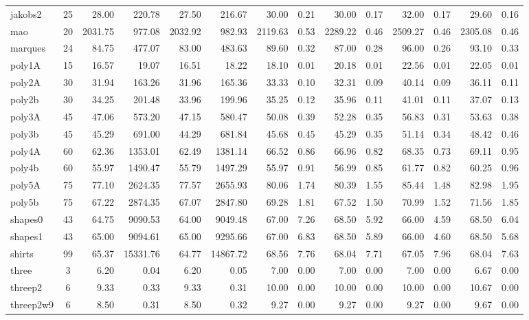 \documentclass[12pt, openright, twoside, a4paper, english, brazilian]{USPSC-classe/USPSC}
\newcommand{\lgray}{\cellcolor{lightgray}}
\begin{document}
\begin{adjustwidth}{-2.5 cm}{-2.5 cm}
\begin{threeparttable}[!htb]
{\begin{tabular}{|l|c|rr|rr|rr|rr|rr|rr|}
        jakobs2 &25 &28.00 &220.78 &\lgray27.50 &216.67 &30.00 &0.21 &30.00 &0.17 &32.00 &0.17 &29.60 &0.16 \\
        mao &20 &\lgray2031.75 &977.08 &2032.92 &982.93 &2119.63 &0.53 &2289.22 &0.46 &2509.27 &0.46 &2305.08 &0.46 \\
        marques &24 &84.75 &477.07 &\lgray83.00 &483.63 &89.60 &0.32 &87.00 &0.28 &96.00 &0.26 &93.10 &0.33 \\
        poly1A &15 &16.57 &19.07 &\lgray16.51 &18.22 &18.10 &0.01 &20.18 &0.01 &22.56 &0.01 &22.05 &0.01 \\
        poly2A &30 &\lgray31.94 &163.26 &31.96 &165.36 &33.33 &0.10 &32.31 &0.09 &40.14 &0.09 &36.11 &0.11 \\
        poly2b &30 &34.25 &201.48 &\lgray33.96 &199.96 &35.25 &0.12 &35.96 &0.11 &41.01 &0.11 &37.07 &0.13 \\
        poly3A &45 &\lgray47.06 &573.20 &47.15 &580.47 &50.08 &0.39 &52.28 &0.35 &56.83 &0.31 &53.63 &0.38 \\
        poly3b &45 &45.29 &691.00 &\lgray44.29 &681.84 &45.68 &0.45 &45.29 &0.35 &51.14 &0.34 &48.42 &0.46 \\
        poly4A &60 &\lgray62.36 &1353.01 &62.49 &1381.14 &66.52 &0.86 &66.96 &0.82 &68.35 &0.73 &69.11 &0.95 \\
        poly4b &60 &55.97 &1490.47 &\lgray55.79 &1497.29 &55.97 &0.91 &56.99 &0.85 &61.77 &0.82 &60.25 &0.96 \\
        poly5A &75 &\lgray77.10 &2624.35 &77.57 &2655.93 &80.06 &1.74 &80.39 &1.55 &85.44 &1.48 &82.98 &1.95 \\
        poly5b &75 &67.22 &2874.35 &\lgray67.07 &2847.80 &69.28 &1.81 &67.52 &1.50 &70.99 &1.52 &71.56 &1.85 \\
        shapes0 &43 &64.75 &9090.53 &\lgray64.00 &9049.48 &67.00 &7.26 &68.50 &5.92 &66.00 &4.59 &68.50 &6.04 \\
        shapes1 &43 &\lgray65.00 &9094.61 &\lgray65.00 &9295.66 &67.00 &6.83 &68.50 &5.89 &66.00 &4.60 &68.50 &5.68 \\
        shirts &99 &65.37 &15331.76 &\lgray64.77 &14867.72 &68.56 &7.76 &68.04 &7.71 &67.05 &7.96 &68.04 &7.63 \\
        three &3 &\lgray6.20 &0.04 &\lgray6.20 &0.05 &7.00 &0.00 &7.00 &0.00 &7.00 &0.00 &6.67 &0.00 \\
        threep2 &6 &\lgray9.33 &0.33 &\lgray9.33 &0.31 &10.00 &0.00 &10.00 &0.00 &10.00 &0.00 &10.67 &0.00 \\
        threep2w9 &6 &\lgray8.50 &0.31 &\lgray8.50 &0.32 &9.27 &0.00 &9.27 &0.00 &9.27 &0.00 &9.67 &0.00 \\

\end{tabular}}
\end{threeparttable}
\end{adjustwidth}
\end{document}
